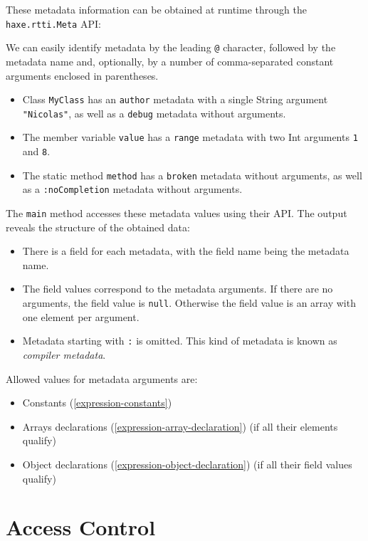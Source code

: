 \documentclass[a4paper,oneside]{book}
\newcommand{\type}[1]{\texttt{#1}}
\newcommand{\expr}[1]{\texttt{#1}}
\newcommand{\tref}[2]{#1 (\ref{#2})}
\newcommand{\haxe}[2][]{%
}
\begin{document}
These metadata information can be obtained at runtime through the \type{haxe.rtti.Meta} API:

\haxe{assets/Meta.hx}

We can easily identify metadata by the leading \expr{@} character, followed by the metadata name and, optionally, by a number of comma-separated constant arguments enclosed in parentheses.

\begin{itemize}
	\item Class \type{MyClass} has an \expr{author} metadata with a single String argument \expr{"Nicolas"}, as well as a \expr{debug} metadata without arguments.
	\item The member variable \expr{value} has a \expr{range} metadata with two Int arguments \expr{1} and \expr{8}.
	\item The static method \expr{method} has a \expr{broken} metadata without arguments, as well as a \expr{:noCompletion} metadata without arguments.
\end{itemize}

The \expr{main} method accesses these metadata values using their API. The output reveals the structure of the obtained data:

\begin{itemize}
	\item There is a field for each metadata, with the field name being the metadata name.
	\item The field values correspond to the metadata arguments. If there are no arguments, the field value is \expr{null}. Otherwise the field value is an array with one element per argument.
	\item Metadata starting with \expr{:} is omitted. This kind of metadata is known as \emph{compiler metadata}.
\end{itemize}

Allowed values for metadata arguments are:

\begin{itemize}
	\item \tref{Constants}{expression-constants}
	\item \tref{Arrays declarations}{expression-array-declaration} (if all their elements qualify)
	\item \tref{Object declarations}{expression-object-declaration} (if all their field values qualify)
\end{itemize}

\section{Access Control}
\label{lf-access-control}
\end{document}

